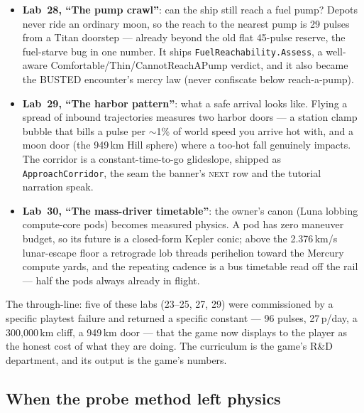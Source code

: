 \documentclass[10pt,twocolumn]{article}
\begin{document}
\begin{itemize}
        the three measured escapes (a Jupiter sling donating 12\,km/s, a 1{,}567\,m/s
        heat-bleed skim, a phasing juke that voids the firing solution) become the
        \texttt{PursuitOdds} the BUSTED pop-up reads.
  \item \textbf{Lab~28, ``The pump crawl''}: can the ship still reach a fuel pump? Depots
        never ride an ordinary moon, so the reach to the nearest pump is 29 pulses from a
        Titan doorstep --- already beyond the old flat 45-pulse reserve, the fuel-starve bug
        in one number. It ships \texttt{FuelReachability.Assess}, a well-aware
        Comfortable/Thin/CannotReachAPump verdict, and it also became the BUSTED encounter's
        mercy law (never confiscate below reach-a-pump).
  \item \textbf{Lab~29, ``The harbor pattern''}: what a safe arrival looks like. Flying a
        spread of inbound trajectories measures two harbor doors --- a station clamp bubble
        that bills a pulse per $\sim$1\% of world speed you arrive hot with, and a moon door
        (the 949\,km Hill sphere) where a too-hot fall genuinely impacts. The corridor is a
        constant-time-to-go glideslope, shipped as \texttt{ApproachCorridor}, the seam the
        banner's \textsc{next} row and the tutorial narration speak.
  \item \textbf{Lab~30, ``The mass-driver timetable''}: the owner's canon (Luna lobbing
        compute-core pods) becomes measured physics. A pod has zero maneuver budget, so its
        future is a closed-form Kepler conic; above the 2.376\,km/s lunar-escape floor a
        retrograde lob threads perihelion toward the Mercury compute yards, and the repeating
        cadence is a bus timetable read off the rail --- half the pods always already in
        flight.
\end{itemize}

The through-line: five of these labs (23--25, 27, 29) were commissioned by a specific
playtest failure and returned a specific constant --- 96 pulses, 27\,p/day, a 300{,}000\,km
cliff, a 949\,km door --- that the game now displays to the player as the honest cost of
what they are doing. The curriculum is the game's R\&D department, and its output is the
game's numbers.

\subsection{When the probe method left physics}
\label{sec:labsui}
\end{document}

